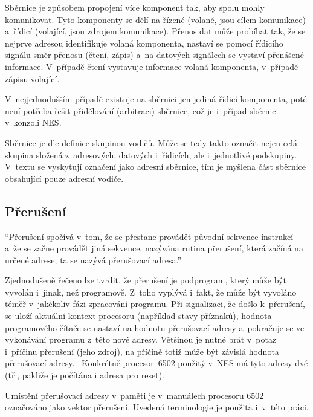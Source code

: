 Sběrnice je způsobem propojení více komponent tak, aby spolu mohly komunikovat. Tyto komponenty se dělí na řízené (volané, jsou cílem komunikace) a~řídicí (volající, jsou zdrojem komunikace). Přenos dat může probíhat tak, že se nejprve adresou identifikuje volaná komponenta, nastaví se pomocí řídicího signálu směr přenosu (čtení, zápis) a~na datových signálech se vystaví přenášené informace. V~případě čtení vystavuje informace volaná komponenta, v~případě zápisu volající.~\cite{Pluhacek1995:plp}

V~nejjednodušším případě existuje na sběrnici jen jediná řídicí komponenta, poté není potřeba řešit přidělování (arbitraci) sběrnice, což je i~případ sběrnic v~konzoli NES.

\begin{note}
	Sběrnice je dle definice skupinou vodičů. Může se tedy takto označit nejen celá skupina složená z~adresových, datových i~řídicích, ale i~jednotlivé podskupiny. V~textu se vyskytují označení jako adresní sběrnice, tím je myšlena část sběrnice obsahující pouze adresní vodiče.
\end{note}

\subsection{Přerušení}
\begin{definition} [Přerušení]
	\enquote{Přerušení spočívá v~tom, že se přestane provádět původní sekvence instrukcí a~že se začne provádět jiná sekvence, nazývána rutina přerušení, která začíná na určené adrese; ta se nazývá přerušovací adresa.}~
\end{definition}

Zjednodušeně řečeno lze tvrdit, že přerušení je podprogram, který může být vyvolán i~jinak, než programově. Z~toho vyplývá i~fakt, že může být vyvoláno téměř v~jakékoliv fázi zpracování programu.  Při signalizaci, že došlo k~přerušení, se uloží aktuální kontext procesoru (například stavy příznaků), hodnota programového čítače se nastaví na hodnotu přerušovací adresy a~pokračuje se ve vykonávání programu z~této nové adresy. Většinou je nutné brát v~potaz i~příčinu přerušení (jeho zdroj), na příčině totiž může být závislá hodnota přerušovací adresy.~\cite{Pluhacek1995:plp} Konkrétně procesor~6502 použitý v~NES má tyto adresy dvě (tři, pakliže je počítána i adresa pro reset).

\begin{note}
	Umístění přerušovací adresy v~paměti je v~manuálech procesoru 6502~ označováno jako vektor přerušení. Uvedená terminologie je použita i~v~této práci.
\end{note}

